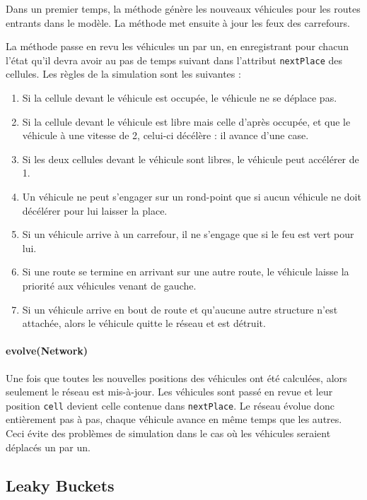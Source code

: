 \documentclass[a4paper,11pt, titlepage]{extarticle}
\begin{document}
Dans un premier temps, la méthode génère les nouveaux véhicules pour les routes entrants dans le modèle. La méthode met ensuite à jour les feux des carrefours.

La méthode passe en revu les véhicules un par un, en enregistrant pour chacun l'état qu'il devra avoir au pas de temps suivant dans l'attribut \texttt{nextPlace} des cellules. Les règles de la simulation sont les suivantes :

\begin{enumerate}
\item Si la cellule devant le véhicule est occupée, le véhicule ne se déplace pas.
\item Si la cellule devant le véhicule est libre mais celle d'après occupée, et que le véhicule à une vitesse de 2, celui-ci décélère : il avance d'une case.
\item Si les deux cellules devant le véhicule sont libres, le véhicule peut accélérer de 1.
\item Un véhicule ne peut s'engager sur un rond-point que si aucun véhicule ne doit décélérer pour lui laisser la place.
\item Si un véhicule arrive à un carrefour, il ne s'engage que si le feu est vert pour lui.
\item Si une route se termine en arrivant sur une autre route, le véhicule laisse la priorité aux véhicules venant de gauche.
\item Si un véhicule arrive en bout de route et qu'aucune autre structure n'est attachée, alors le véhicule quitte le réseau et est détruit.
\end{enumerate}

\paragraph{evolve(Network)}

Une fois que toutes les nouvelles positions des véhicules ont été calculées, alors seulement le réseau est mis-à-jour. Les véhicules sont passé en revue et leur position \texttt{cell} devient celle contenue dans \texttt{nextPlace}. Le réseau évolue donc entièrement pas à pas, chaque véhicule avance en même temps que les autres. Ceci évite des problèmes de simulation dans le cas où les véhicules seraient déplacés un par un.

\subsection{Leaky Buckets}
\end{document}
